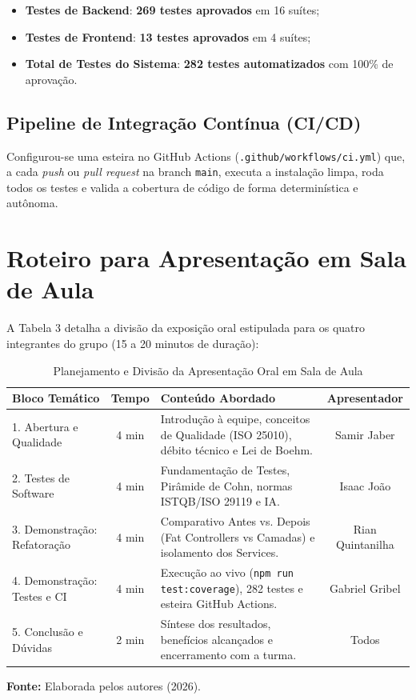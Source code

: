 \documentclass[12pt,a4paper]{article}
\begin{document}
\begin{itemize}
    \item \textbf{Testes de Backend}: \textbf{269 testes aprovados} em 16 suítes;
    \item \textbf{Testes de Frontend}: \textbf{13 testes aprovados} em 4 suítes;
    \item \textbf{Total de Testes do Sistema}: \textbf{282 testes automatizados} com 100\% de aprovação.
\end{itemize}

\subsection{Pipeline de Integração Contínua (CI/CD)}
Configurou-se uma esteira no GitHub Actions (\texttt{.github/workflows/ci.yml}) que, a cada \textit{push} ou \textit{pull request} na branch \texttt{main}, executa a instalação limpa, roda todos os testes e valida a cobertura de código de forma determinística e autônoma.

\section{Roteiro para Apresentação em Sala de Aula}

A Tabela 3 detalha a divisão da exposição oral estipulada para os quatro integrantes do grupo (15 a 20 minutos de duração):

\begin{table}[H]
\centering
\caption{Planejamento e Divisão da Apresentação Oral em Sala de Aula}
\label{tab:apresentacao_abnt}
\small
\begin{tabularx}{\textwidth}{p{3.8cm}cp{6.8cm}c}
\toprule
\textbf{Bloco Temático} & \textbf{Tempo} & \textbf{Conteúdo Abordado} & \textbf{Apresentador} \\
\midrule
1. Abertura e Qualidade & 4 min & Introdução à equipe, conceitos de Qualidade (ISO 25010), débito técnico e Lei de Boehm. & Samir Jaber \\
2. Testes de Software & 4 min & Fundamentação de Testes, Pirâmide de Cohn, normas ISTQB/ISO 29119 e IA. & Isaac João \\
3. Demonstração: Refatoração & 4 min & Comparativo Antes vs. Depois (Fat Controllers vs Camadas) e isolamento dos Services. & Rian Quintanilha \\
4. Demonstração: Testes e CI & 4 min & Execução ao vivo (\texttt{npm run test:coverage}), 282 testes e esteira GitHub Actions. & Gabriel Gribel \\
5. Conclusão e Dúvidas & 2 min & Síntese dos resultados, benefícios alcançados e encerramento com a turma. & Todos \\
\bottomrule
\end{tabularx}
\vspace{0.1cm}
{\footnotesize \textbf{Fonte:} Elaborada pelos autores (2026).}
\end{table}
\end{document}
